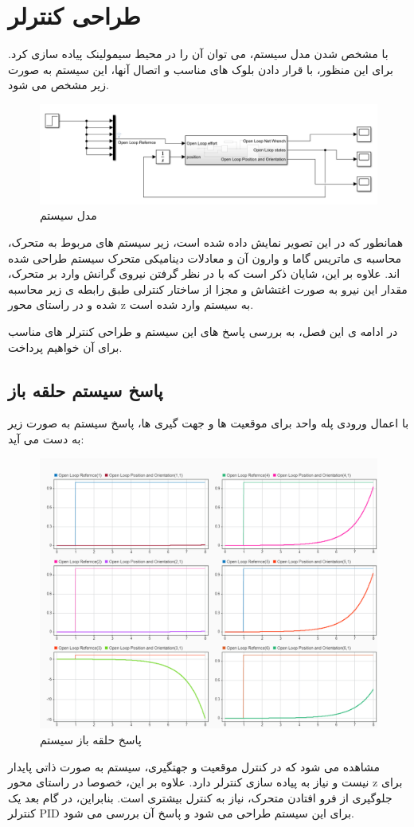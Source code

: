\section{طراحی کنترلر}
با مشخص شدن مدل سیستم، می توان آن را در محیط سیمولینک پیاده سازی کرد. برای این منظور، با قرار دادن بلوک های مناسب و اتصال آنها، این سیستم به صورت زیر مشخص می شود.
\begin{figure}[H]
	\centering
	\includegraphics[width=1\linewidth]{../img/Plant}
	\caption{مدل سیستم}
	\label{fig:plant}
\end{figure}
همانطور که در این تصویر نمایش داده شده است، زیر سیستم های مربوط به متحرک، محاسبه ی ماتریس گاما و وارون آن و معادلات دینامیکی متحرک سیستم طراحی شده اند. علاوه بر این، شایان ذکر است که با در نظر گرفتن نیروی گرانش وارد بر متحرک، مقدار این نیرو به صورت اغتشاش و مجزا از ساختار کنترلی طبق رابطه ی زیر محاسبه شده و در راستای محور z به سیستم وارد شده است. 

در ادامه ی این فصل، به بررسی پاسخ های این سیستم و طراحی کنترلر های مناسب برای آن خواهیم پرداخت.

\subsection{پاسخ سیستم حلقه باز}
با اعمال ورودی پله واحد برای موقعیت ها و جهت گیری ها، پاسخ سیستم به صورت زیر به دست می آید:
\begin{figure}[H]
	\centering
	\includegraphics[width=1\linewidth]{../img/openloop_response}
	\caption{پاسخ حلقه باز سیستم}
	\label{fig:openloopresponse}
\end{figure}
مشاهده می شود که در کنترل موقعیت و جهتگیری، سیستم به صورت ذاتی پایدار نیست و نیاز به پیاده سازی کنترلر دارد. علاوه بر این، خصوصا در راستای محور z برای جلوگیری از فرو افتادن متحرک، نیاز به کنترل بیشتری است.
بنابراین، در گام بعد یک کنترلر PID برای این سیستم طراحی می شود و پاسخ آن بررسی می شود.
